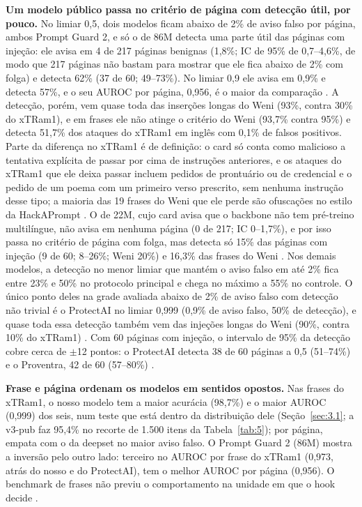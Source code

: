 \documentclass[11pt]{article}
\begin{document}
\textbf{Um modelo público passa no critério de página com detecção útil, por pouco.} No limiar 0,5, dois modelos ficam abaixo de 2\% de aviso falso por página, ambos Prompt Guard 2, e só o de 86M detecta uma parte útil das páginas com injeção: ele avisa em 4 de 217 páginas benignas (1,8\%; IC de 95\% de 0,7–4,6\%, de modo que 217 páginas não bastam para mostrar que ele fica abaixo de 2\% com folga) e detecta 62\% (37 de 60; 49–73\%). No limiar 0,9 ele avisa em 0,9\% e detecta 57\%, e o seu AUROC por página, 0,956, é o maior da comparação%
. A detecção, porém, vem quase toda das inserções longas do Weni (93\%, contra 30\% do xTRam1), e em frases ele não atinge o critério do Weni (93,7\% contra 95\%) e detecta 51,7\% dos ataques do xTRam1 em inglês com 0,1\% de falsos positivos. Parte da diferença no xTRam1 é de definição: o card só conta como malicioso a tentativa explícita de passar por cima de instruções anteriores, e os ataques do xTRam1 que ele deixa passar incluem pedidos de prontuário ou de credencial e o pedido de um poema com um primeiro verso prescrito, sem nenhuma instrução desse tipo; a maioria das 19 frases do Weni que ele perde são ofuscações no estilo da HackAPrompt%
. O de 22M, cujo card avisa que o backbone não tem pré-treino multilíngue, não avisa em nenhuma página (0 de 217; IC 0–1,7\%), e por isso passa no critério de página com folga, mas detecta só 15\% das páginas com injeção (9 de 60; 8–26\%; Weni 20\%) e 16,3\% das frases do Weni%
. Nos demais modelos, a detecção no menor limiar que mantém o aviso falso em até 2\% fica entre 23\% e 50\% no protocolo principal e chega no máximo a 55\% no controle. O único ponto deles na grade avaliada abaixo de 2\% de aviso falso com detecção não trivial é o ProtectAI no limiar 0,999 (0,9\% de aviso falso, 50\% de detecção), e quase toda essa detecção também vem das injeções longas do Weni (90\%, contra 10\% do xTRam1)%
. Com 60 páginas com injeção, o intervalo de 95\% da detecção cobre cerca de \ensuremath{\pm}12 pontos: o ProtectAI detecta 38 de 60 páginas a 0,5 (51–74\%) e o Proventra, 42 de 60 (57–80\%)%
.

\textbf{Frase e página ordenam os modelos em sentidos opostos.} Nas frases do xTRam1, o nosso modelo tem a maior acurácia (98,7\%) e o maior AUROC (0,999) dos seis, num teste que está dentro da distribuição dele (Seção~\ref{sec:3.1}; a v3-pub faz 95,4\% no recorte de 1.500 itens da Tabela~\ref{tab:5}); por página, empata com o da deepset no maior aviso falso. O Prompt Guard 2 (86M) mostra a inversão pelo outro lado: terceiro no AUROC por frase do xTRam1 (0,973, atrás do nosso e do ProtectAI), tem o melhor AUROC por página (0,956). O benchmark de frases não previu o comportamento na unidade em que o hook decide%
.
\end{document}
